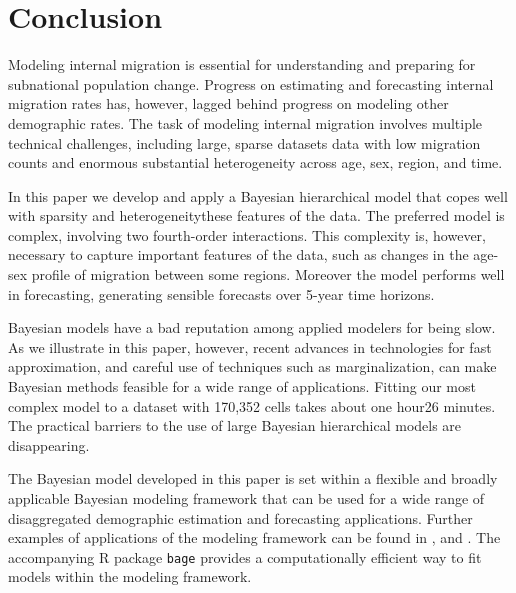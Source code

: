 \documentclass{article}
\begin{document}
{\section{Conclusion}



Modeling internal migration is essential for understanding and preparing for subnational population change. Progress on estimating and forecasting internal migration rates has, however, lagged behind progress on modeling other demographic rates. The task of modeling internal migration involves multiple technical challenges, including {\color{yellow}large, sparse datasets} {\color{magenta}data with low migration counts} and {\color{yellow}enormous} {\color{magenta}substantial} heterogeneity across age, sex, region, and time. 

In this paper we develop and apply a Bayesian hierarchical model that copes well with {\color{yellow}sparsity and heterogeneity}{\color{magenta}these features of the data}. The preferred model is complex, involving two fourth-order interactions. This complexity is, however, necessary to capture important features of the data, such as changes in the age-sex profile of migration between some regions. Moreover the model performs well in forecasting, generating sensible forecasts over 5-year time horizons.

Bayesian models have a bad reputation among applied modelers for being slow. As we illustrate in this paper, however, recent advances in technologies for fast approximation, and careful use of techniques such as marginalization, can make Bayesian methods feasible for a wide range of applications. Fitting our most complex model to a dataset with 170,352 cells takes about {\color{yellow}one hour}{\color{magenta}26 minutes}. The practical barriers to the use of large Bayesian hierarchical models are disappearing.

{\color{magenta}The Bayesian model developed in this paper is set within a flexible and broadly applicable Bayesian modeling framework that can be used for a wide range of disaggregated demographic estimation and forecasting applications.  Further examples of applications of the modeling framework can be found in \cite{bryant2018bayesian}, \cite{zhang2019bayesian} and \cite{bryant2026estimating}. The accompanying R package \texttt{bage} provides a computationally efficient way to fit models within the modeling framework.}

}
\end{document}
